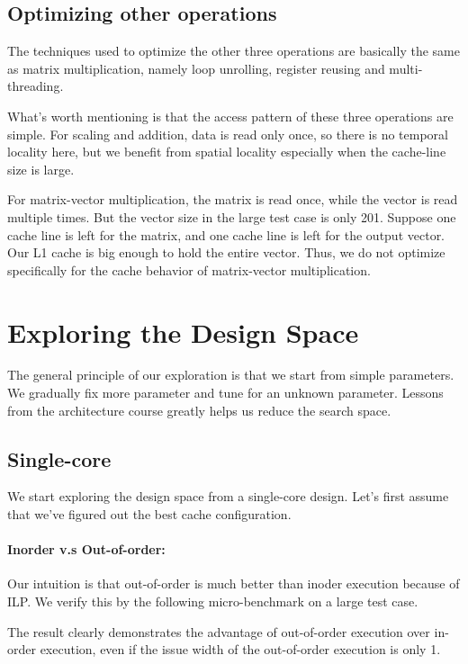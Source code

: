 \documentclass[twocolumn,letterpaper,10pt]{article}
\begin{document}
\subsection{Optimizing other operations}
The techniques used to optimize the other three operations are
basically the same as matrix multiplication, namely loop unrolling,
register reusing and multi-threading.

What's worth mentioning is that the access pattern of these three
operations are simple. For
scaling and addition, data is read only once, so there is no
temporal locality here, but we benefit from spatial locality
especially when the cache-line size is large.

For matrix-vector multiplication, the matrix is read once, while the
vector is read multiple times. But the vector size in the large test
case is only 201. Suppose one cache line is left for the matrix, and one cache line
is left for the output vector. Our L1 cache is big enough to hold the
entire vector. Thus, we do not optimize specifically for the cache
behavior of matrix-vector multiplication.


\section{Exploring the Design Space}
\label{sec:design}

The general principle of our exploration is that we start from simple
parameters. We gradually fix more parameter and tune for an unknown
parameter. Lessons from the architecture course greatly helps us reduce the search space.

\subsection{Single-core}
We start exploring the design space from a single-core design. Let's
first assume that we've figured out the best cache configuration.

\paragraph{Inorder v.s Out-of-order:} Our intuition is that
out-of-order is much better than inoder execution because of ILP. We
verify this by the following micro-benchmark on a large test case.

The result clearly demonstrates the advantage of out-of-order
execution over in-order execution, even if the issue width of the
out-of-order execution is only 1.
\end{document}
